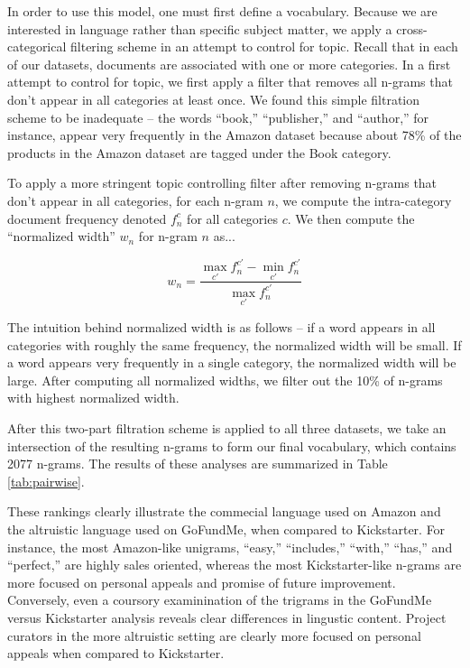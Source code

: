 \documentclass[letterpaper]{article}
\begin{document}
In order to use this model, one must first define a vocabulary. Because we are interested in language rather than specific subject matter, we apply a cross-categorical filtering scheme in an attempt to control for topic. Recall that in each of our datasets, documents are associated with one or more categories. In a first attempt to control for topic, we first apply a filter that removes all n-grams that don't appear in all categories at least once. We found this simple filtration scheme to be inadequate -- the words ``book,'' ``publisher,'' and ``author,'' for instance, appear very frequently in the Amazon dataset because about 78\% of the products in the Amazon dataset are tagged under the Book category.

To apply a more stringent topic controlling filter after removing n-grams that don't appear in all categories, for each n-gram $n$, we compute the intra-category document frequency denoted $f_n^c$ for all categories $c$. We then compute the ``normalized width'' $w_n$ for n-gram $n$ as...

\begin{equation} \label{eq:width}
w_n = \frac{\max\limits_{c'}f_n^{c'} - \min\limits_{c'}f_n^{c'}}{\max\limits_{c'}f_n^{c'}}
\end{equation}

The intuition behind normalized width is as follows -- if a word appears in all categories with roughly the same frequency, the normalized width will be small. If a word appears very frequently in a single category, the normalized width will be large. After computing all normalized widths, we filter out the 10\% of n-grams with highest normalized width.

After this two-part filtration scheme is applied to all three datasets, we take an intersection of the resulting n-grams to form our final vocabulary, which contains 2077 n-grams. The results of these analyses are summarized in Table \ref{tab:pairwise}.

These rankings clearly illustrate the commecial language used on Amazon and the altruistic language used on GoFundMe, when compared to Kickstarter. For instance, the most Amazon-like unigrams, ``easy,'' ``includes,'' ``with,'' ``has,'' and ``perfect,'' are highly sales oriented, whereas the most Kickstarter-like n-grams are more focused on personal appeals and promise of future improvement. Conversely, even a coursory examinination of the trigrams in the GoFundMe versus Kickstarter analysis reveals clear differences in lingustic content. Project curators in the more altruistic setting are clearly more focused on personal appeals when compared to Kickstarter.
\end{document}
